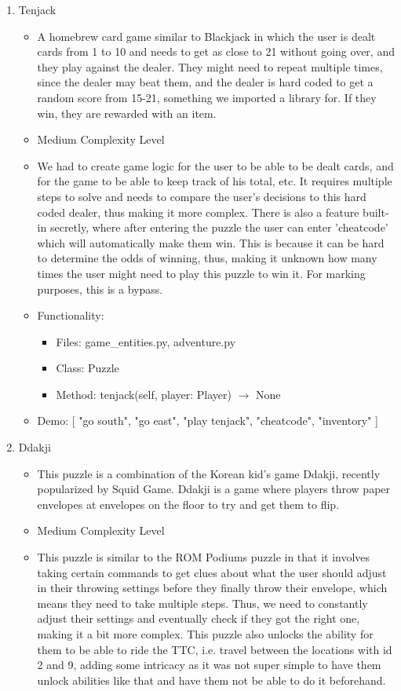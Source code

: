 \documentclass[11pt]{article}
\begin{document}
\begin{enumerate}
    \item Tenjack
    \begin{itemize}
       \item A homebrew card game similar to Blackjack in which the user is dealt cards from 1 to 10 and needs to get as close to 21 without going over, and they play against the dealer. They might need to repeat multiple times, since the dealer may beat them, and the dealer is hard coded to get a random score from 15-21, something we imported a library for. If they win, they are rewarded with an item.
       \item Medium Complexity Level
       \item We had to create game logic for the user to be able to be dealt cards, and for the game to be able to keep track of his total, etc. It requires multiple steps to solve and needs to compare the user's decisions to this hard coded dealer, thus making it more complex. There is also a feature built-in secretly, where after entering the puzzle the user can enter 'cheatcode' which will automatically make them win. This is because it can be hard to determine the odds of winning, thus, making it unknown how many times the user might need to play this puzzle to win it. For marking purposes, this is a bypass.
       \item Functionality:
        \begin{itemize}
            \item Files: game\_entities.py, adventure.py
            \item Class: Puzzle
            \item Method: tenjack(self, player: Player) $\rightarrow$ None
        \end{itemize}
       \item Demo: [
        "go south", "go east", "play tenjack", "cheatcode", "inventory"
    ]
    \end{itemize}
    \item Ddakji
    \begin{itemize}
       \item This puzzle is a combination of the Korean kid's game Ddakji, recently popularized by Squid Game. Ddakji is a game where players throw paper envelopes at envelopes on the floor to try and get them to flip. 
       \item Medium Complexity Level
       \item This puzzle is similar to the ROM Podiums puzzle in that it involves taking certain commands to get clues about what the user should adjust in their throwing settings before they finally throw their envelope, which means they need to take multiple steps. Thus, we need to constantly adjust their settings and eventually check if they got the right one, making it a bit more complex. This puzzle also unlocks the ability for them to be able to ride the TTC, i.e. travel between the locations with id 2 and 9, adding some intricacy as it was not super simple to have them unlock abilities like that and have them not be able to do it beforehand.

\end{itemize}
\end{enumerate}
\end{document}
